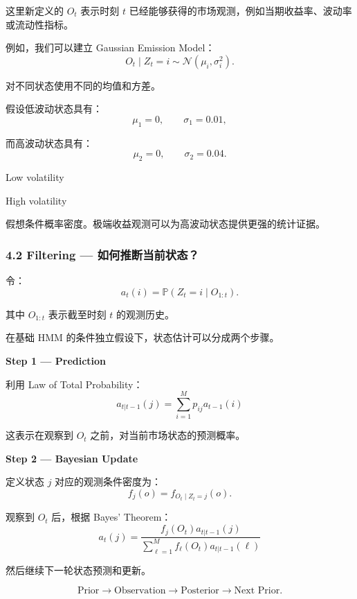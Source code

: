 这里新定义的 \(O_t\) 表示时刻 \(t\) 已经能够获得的市场观测，例如当期收益率、波动率或流动性指标。


例如，我们可以建立 Gaussian Emission Model：
\[O_t\mid Z_t=i
\sim
\mathcal N(\mu_i,\sigma_i^2).\]

对不同状态使用不同的均值和方差。

假设低波动状态具有：
\[\mu_1=0,\qquad\sigma_1=0.01,\]

而高波动状态具有：
\[\mu_2=0,\qquad\sigma_2=0.04.\]


Low volatility

High volatility

假想条件概率密度。极端收益观测可以为高波动状态提供更强的统计证据。

\hypertarget{part-4-77-0001-filtering-ux5982ux4f55ux63a8ux65adux5f53ux524dux72b6ux6001}{%
\subsubsection{4.2 Filtering --- 如何推断当前状态？}\label{part-4-77-0001-filtering-ux5982ux4f55ux63a8ux65adux5f53ux524dux72b6ux6001}}

令：
\[a_t(i)
=
\mathbb P(Z_t=i\mid O_{1:t}).\]

其中 \(O_{1:t}\) 表示截至时刻 \(t\) 的观测历史。

在基础 HMM 的条件独立假设下，状态估计可以分成两个步骤。

\textbf{Step 1 --- Prediction}

利用 Law of Total Probability：
\[\boxed{
a_{t|t-1}(j)
=
\sum_{i=1}^{M}p_{ij}a_{t-1}(i)
}\]

这表示在观察到 \(O_t\) 之前，对当前市场状态的预测概率。

\textbf{Step 2 --- Bayesian Update}

定义状态 \(j\) 对应的观测条件密度为：
\[f_j(o)=f_{O_t\mid Z_t=j}(o).\]

观察到 \(O_t\) 后，根据 Bayes' Theorem：
\[\boxed{
a_t(j)
=
\frac{
f_j(O_t)a_{t|t-1}(j)
}{
\sum_{\ell=1}^{M}
f_\ell(O_t)a_{t|t-1}(\ell)
}
}\]

然后继续下一轮状态预测和更新。

\[\text{Prior}
\longrightarrow
\text{Observation}
\longrightarrow
\text{Posterior}
\longrightarrow
\text{Next Prior}.\]

